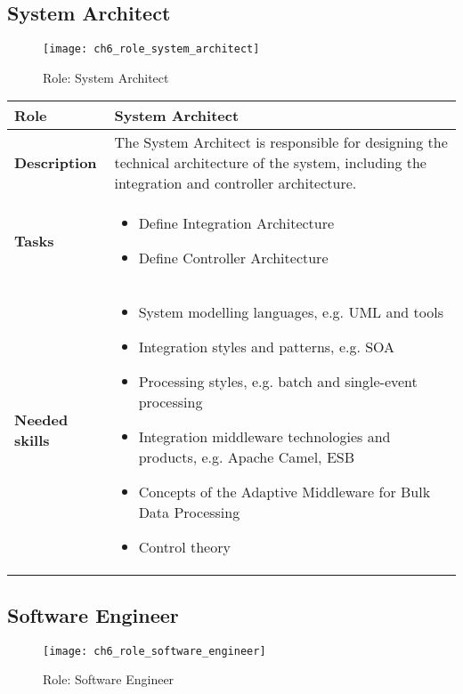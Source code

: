 \newpage

\subsection{System Architect} 

\begin{figure}[htpb] \centering 
	\texttt{[image: ch6\_role\_system\_architect]} 
	\caption{Role: System Architect} 
	\label{fig:ch6_role_system_architect} 
\end{figure}

\begin{tabularx}{\textwidth}{@{} l X @{}}
	\caption{System Architect}\label{table:ch6_Role_System_Architect}\\
	\toprule 
	\bfseries Role & System Architect\\
	\midrule
	\bfseries Description & The System Architect is responsible for designing the technical architecture of the system, including the integration and controller architecture.\\
	\midrule
	\bfseries Tasks & 
	\begin{itemize}
		\item Define Integration Architecture
		\item Define Controller Architecture
	\end{itemize}
	\\
	\midrule
	\bfseries Needed skills & 
	\begin{itemize}
		\item System modelling languages, e.g. \ac{UML} and tools
		\item Integration styles and patterns, e.g. \ac{SOA}
		\item Processing styles, e.g. batch and single-event processing
		\item Integration middleware technologies and products, e.g. Apache Camel, \ac{ESB}
		\item Concepts of the Adaptive Middleware for Bulk Data Processing
		\item Control theory
	\end{itemize}
	\\
	\bottomrule
\end{tabularx}


\subsection{Software Engineer}

\begin{figure}[htpb] \centering 
	\texttt{[image: ch6\_role\_software\_engineer]} 
	\caption{Role: Software Engineer} 
	\label{fig:ch6_role_software_engineer} 
\end{figure}

